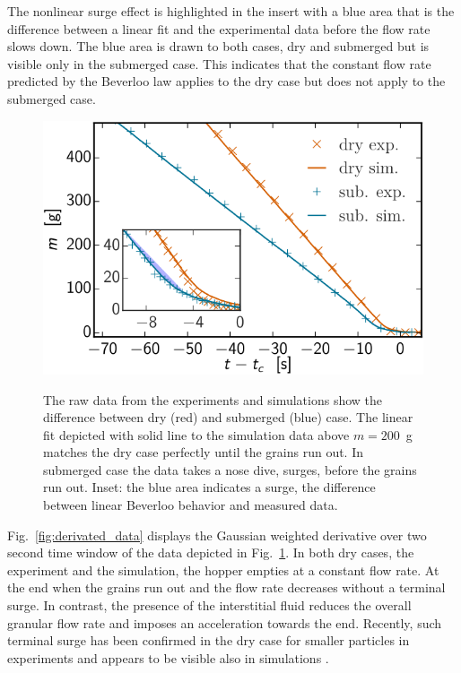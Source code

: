 \documentclass[twoside,twocolumn,9pt]{article}
\begin{document}
{The nonlinear surge effect is highlighted in the insert with a blue area that is the difference between a linear fit and the experimental data before the flow rate slows down. 
The blue area is drawn to both cases, dry and submerged but is visible only in the submerged case.
This indicates that the constant flow rate predicted by the Beverloo law applies to the dry case but does not apply to the submerged case.  }
%
\begin{figure}[!t] %
 \includegraphics[width=\columnwidth]{fig8-m_vs_t-exp_sim.pdf}\\
 \caption{The raw data from the experiments and simulations show the difference between dry (red) and submerged (blue) case. The linear fit depicted with solid line to the simulation data above $m = 200$~g matches the dry case perfectly until the grains run out. In submerged case the data takes a nose dive, surges, before the grains run out. Inset: the blue area indicates a surge, the difference between linear Beverloo behavior and measured data.}
 \label{fig:flow_rates}
\end{figure}

Fig.~\ref{fig:derivated_data} displays the Gaussian weighted derivative over two second time window of the data depicted in Fig.~\ref{fig:flow_rates}. In both dry cases, the experiment and the simulation, the hopper empties at a constant flow rate. 
At the end when the grains run out and the flow rate decreases without a terminal surge. 
In contrast, the presence of the interstitial fluid reduces the overall granular flow rate and imposes an acceleration towards the end. Recently, such terminal surge has been confirmed in the dry case for smaller particles in experiments \cite{koivistoSubmitted} and appears to be visible also in simulations \cite{DunatungaJFM15,SchwartzGM12}.
\end{document}
